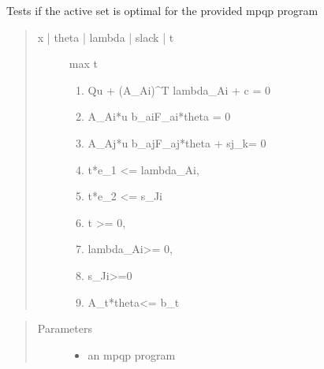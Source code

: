 \documentclass[letterpaper,10pt,english]{sphinxmanual}
\begin{document}
\begin{fulllineitems}
\label{\detokenize{mpo.utils:mpo.utils.mpqp_utils.check_optimality}}
\sphinxAtStartPar
Tests if the active set is optimal for the provided mpqp program
\begin{quote}
\begin{description}
\item[{x | theta | lambda | slack | t}] \leavevmode
\sphinxAtStartPar
max t
\begin{enumerate}
%
\item {} 
\sphinxAtStartPar
Qu + (A\_Ai)\textasciicircum{}T lambda\_Ai + c = 0

\item {} 
\sphinxAtStartPar
A\_Ai*u \sphinxhyphen{} b\_ai\sphinxhyphen{}F\_ai*theta = 0

\item {} 
\sphinxAtStartPar
A\_Aj*u \sphinxhyphen{} b\_aj\sphinxhyphen{}F\_aj*theta + sj\_k= 0

\item {} 
\sphinxAtStartPar
t*e\_1 \textless{}= lambda\_Ai,

\item {} 
\sphinxAtStartPar
t*e\_2 \textless{}= s\_Ji

\item {} 
\sphinxAtStartPar
t \textgreater{}= 0,

\item {} 
\sphinxAtStartPar
lambda\_Ai\textgreater{}= 0,

\item {} 
\sphinxAtStartPar
s\_Ji\textgreater{}=0

\item {} 
\sphinxAtStartPar
A\_t*theta\textless{}= b\_t

\end{enumerate}

\end{description}
\end{quote}
\begin{quote}\begin{description}
\item[{Parameters}] \leavevmode\begin{itemize}
\item {} 
\sphinxAtStartPar
{} \textendash{} an mpqp program


\end{itemize}
\end{description}
\end{quote}
\end{fulllineitems}
\end{document}
